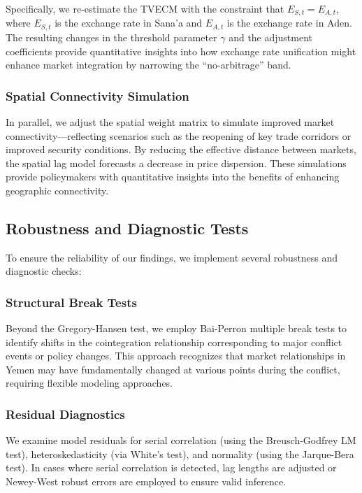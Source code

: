 Specifically, we re-estimate the TVECM with the constraint that $E_{S,t} = E_{A,t}$, where $E_{S,t}$ is the exchange rate in Sana'a and $E_{A,t}$ is the exchange rate in Aden. The resulting changes in the threshold parameter $\gamma$ and the adjustment coefficients provide quantitative insights into how exchange rate unification might enhance market integration by narrowing the ``no-arbitrage'' band.

\subsubsection{Spatial Connectivity Simulation}

In parallel, we adjust the spatial weight matrix to simulate improved market connectivity—reflecting scenarios such as the reopening of key trade corridors or improved security conditions. By reducing the effective distance between markets, the spatial lag model forecasts a decrease in price dispersion. These simulations provide policymakers with quantitative insights into the benefits of enhancing geographic connectivity.

\subsection{Robustness and Diagnostic Tests}

To ensure the reliability of our findings, we implement several robustness and diagnostic checks:

\subsubsection{Structural Break Tests}

Beyond the Gregory-Hansen test, we employ Bai-Perron multiple break tests to identify shifts in the cointegration relationship corresponding to major conflict events or policy changes.\autocite{bai1998} This approach recognizes that market relationships in Yemen may have fundamentally changed at various points during the conflict, requiring flexible modeling approaches.

\subsubsection{Residual Diagnostics}

We examine model residuals for serial correlation (using the Breusch-Godfrey LM test), heteroskedasticity (via White's test), and normality (using the Jarque-Bera test). In cases where serial correlation is detected, lag lengths are adjusted or Newey-West robust errors are employed to ensure valid inference.

